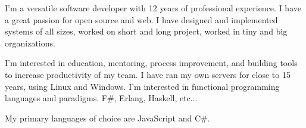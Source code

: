 
\begin{cvparagraph}
I'm a versatile software developer with 12 years of professional experience. I have a great passion for open source and web. I have designed and implemented systems of all sizes, worked on short and long project, worked in tiny and big organizations.

I'm interested in education, mentoring, process improvement, and building tools to increase productivity of my team. I have ran my own servers for close to 15 years, using Linux and Windows. I'm interested in functional programming languages and paradigms. F\#, Erlang, Haskell, etc...

My primary languages of choice are JavaScript and C\#.
\end{cvparagraph}